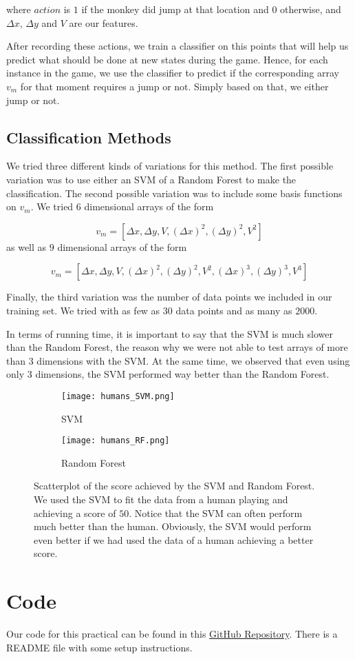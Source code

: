 \documentclass[10pt]{article}
\begin{document}
where $action$ is $1$ if the monkey did jump at that location and $0$ otherwise,
and $\Delta x$, $\Delta y$ and $V$ are our features.

\medskip

After recording these actions, we train a classifier on this points that will 
help us predict what should be done at new states during the game. Hence, for 
each instance in the game, we use the classifier to predict if the corresponding 
array $v_m$ for that moment requires a jump or not. Simply based on that, we 
either jump or not.

\subsection{Classification Methods}

We tried three different kinds of variations for this method. The first possible 
variation was to use either an SVM of a Random Forest to make the classification.
 The second possible variation was to include some basis functions on $v_m$. We 
 tried $6$ dimensional arrays of the form

\[v_m = [\Delta x, \Delta y, V, (\Delta x)^2, (\Delta y)^2, V^2]\]
as well as $9$ dimensional arrays of the form

\[v_m = [\Delta x, \Delta y, V, (\Delta x)^2, (\Delta y)^2, V^2, (\Delta x)^3, 
(\Delta y)^3, V^3]\]

\medskip

Finally, the third variation was the number of data points we included in our 
training set. We tried with as few as $30$ data points and as many as $2000$. 

\medskip

In terms of running time, it is important to say that the SVM is much slower 
than the Random Forest, the reason why we were not able to test arrays of more 
than $3$ dimensions with the SVM. At the same time, we observed that even using 
only $3$ dimensions, the SVM performed way better than the Random Forest.

\medskip

\begin{figure}[H]
\centering
\begin{subfigure}{.5\textwidth}
  \centering
  \label{SVM}
  \texttt{[image: humans\_SVM.png]}
  \caption{SVM}
\end{subfigure}%
\begin{subfigure}{.5\textwidth}
  \centering
  \texttt{[image: humans\_RF.png]}
  \caption{Random Forest}
  \label{Random Forest}
\end{subfigure}
\caption{Scatterplot of the score achieved by the SVM and Random Forest. We used the SVM to fit the
data from a human playing and achieving a score of $50$. Notice that the SVM
can often perform much better than the human. Obviously, the SVM would perform
even better if we had used the data of a human achieving a better score.}
\end{figure}

\section{Code}

Our code for this practical can be found in this
\href{https://github.com/victordomene/cs181-practicals/tree/master/practical4}{GitHub
Repository}. There is a README file with some setup instructions.
\end{document}
